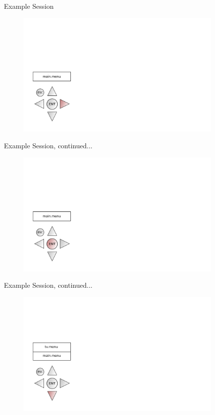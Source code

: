\documentclass[style=smrt,mode=present,paper=screen]{powerdot}
\begin{document}

\begin{slide}{Example Session}
\begin{figure}[htb]
	\includegraphics[width=4in]{figures/example-session-01}
\end{figure}
\end{slide}

\begin{slide}[toc=,bm=]{Example Session, continued...}
\begin{figure}[htb]
	\includegraphics[width=4in]{figures/example-session-02}
\end{figure}
\end{slide}

\begin{slide}[toc=,bm=]{Example Session, continued...}
\begin{figure}[htb]
	\includegraphics[width=4in]{figures/example-session-03}
\end{figure}
\end{slide}
\end{document}
